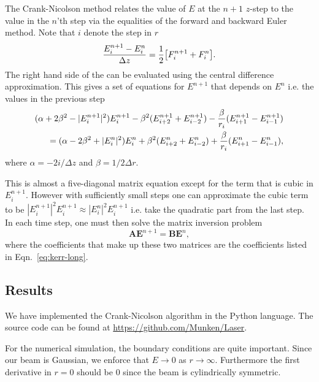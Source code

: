 The Crank-Nicolson method relates the value of $E$ at the $n+1$ $z$-step to the value in the
$n$'th step via the equalities of the forward and backward Euler method. Note that $i$ denote the
step in $r$
\begin{equation}
  \label{eq:Crank-Nicolson-discrete}
  \frac{E^{n+1}_{i} - E^{n}_{i}}{\Delta z} = \frac{1}{2} \big[F_{i}^{n+1}+F_{i}^{n} \big].
\end{equation}
The right hand side of the can be evaluated using the central difference approximation. This gives
a set of equations for $E^{n+1}$ that depends on $E^{n}$ i.e. the values in the previous step
\begin{align}
  \notag
  (\alpha + 2\beta^{2} - |E_{i}^{n+1}|^{2})E_{i}^{n+1} - \beta^{2}(E_{i+2}^{n+1} + E_{i-2}^{n+1}) -
  \frac{\beta}{r_{i}} (E_{i+1}^{n+1} - E_{i-1}^{n+1}) \\
  = (\alpha - 2\beta^{2} + |E_{i}^{n}|^{2})E_{i}^{n} + \beta^{2}(E_{i+2}^{n} + E_{i-2}^{n}) +
  \frac{\beta}{r_{i}} (E_{i+1}^{n} - E_{i-1}^{n}), 
  \label{eq:kerr-long}
\end{align}
where $\alpha = -2i/\!{\Delta z}$ and $\beta = 1/{2 \Delta r}$.

This is almost a five-diagonal matrix equation except for the term that is cubic in
$E_{i}^{n+1}$. However with sufficiently small steps one can approximate the cubic term to be
$|E_{i}^{n+1}|^{2}E_{i}^{n+1} \approx |E_{i}^{n}|^{2}E_{i}^{n+1}$ i.e. take the quadratic part from
the last step. In each time step, one must then solve the matrix inversion problem
\begin{equation}
  \label{eq:matrix}
  \mathbf{A} \mathbf{E}^{n+1} = \mathbf{B} \mathbf{E}^{n}, 
\end{equation}
where the coefficients that make up these two matrices are the coefficients listed in
Eqn.~\eqref{eq:kerr-long}. 

\subsection{Results}
\label{sec:kerr-results}

We have implemented the Crank-Nicolson algorithm in the Python language. The source code can be found at
\url{https://github.com/Munken/Laser}.

For the numerical simulation, the boundary conditions are quite important. Since our beam is Gaussian,
we enforce that $E \rightarrow 0$ as $r \rightarrow \infty$.
Furthermore the first derivative in $r = 0$ should be 0 since the beam is cylindrically symmetric.


